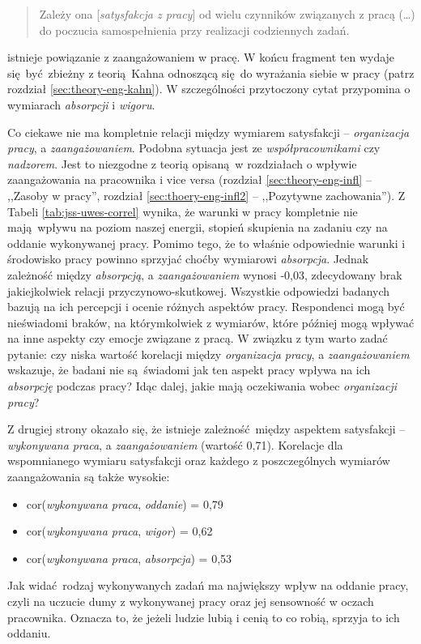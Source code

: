 \begin{quote}
  Zależy ona [\textit{satysfakcja z pracy}] od wielu czynników związanych z pracą (\ldots) do poczucia samospełnienia przy realizacji codziennych zadań.
\end{quote}

istnieje powiązanie z zaangażowaniem w pracę. W końcu fragment ten wydaje się być zbieżny z teorią Kahna odnoszącą się do wyrażania siebie w pracy (patrz rozdział \ref{sec:theory-eng-kahn}). W szczególności przytoczony cytat przypomina o wymiarach \textit{absorpcji} i \textit{wigoru}. 

Co ciekawe nie ma kompletnie relacji między wymiarem satysfakcji -- \textit{organizacja pracy}, a \textit{zaangażowaniem}. Podobna sytuacja jest ze \textit{współpracownikami} czy \textit{nadzorem}. Jest to niezgodne z teorią opisaną w rozdziałach o wpływie zaangażowania na pracownika i vice versa (rozdział \ref{sec:theory-eng-infl} -- ,,Zasoby w pracy'', rozdział \ref{sec:thoery-eng-infl2} -- ,,Pozytywne zachowania''). Z Tabeli \ref{tab:jss-uwes-correl} wynika, że warunki w pracy kompletnie nie mają wpływu na poziom naszej energii, stopień skupienia na zadaniu czy na oddanie
wykonywanej pracy. Pomimo tego, że to właśnie odpowiednie warunki i środowisko pracy powinno sprzyjać choćby wymiarowi \textit{absorpcja}. Jednak zależność między \textit{absorpcją}, a \textit{zaangażowaniem} wynosi
-0,03, zdecydowany brak jakiejkolwiek relacji przyczynowo-skutkowej. Wszystkie odpowiedzi badanych bazują na ich percepcji i ocenie różnych aspektów pracy. Respondenci mogą być nieświadomi braków, na którymkolwiek z wymiarów, które później mogą wpływać na inne aspekty czy emocje związane z pracą. W związku z tym warto zadać pytanie: czy niska wartość korelacji między \textit{organizacja pracy}, a \textit{zaangażowaniem} wskazuje, że badani nie są świadomi jak ten aspekt pracy wpływa na ich \textit{absorpcję} podczas pracy? Idąc dalej, jakie mają oczekiwania wobec
\textit{organizacji pracy}?

Z drugiej strony okazało się, że istnieje zależność między aspektem satysfakcji --\textit{wykonywana praca}, a \textit{zaangażowaniem} (wartość 0,71). Korelacje dla wspomnianego wymiaru satysfakcji oraz każdego z poszczególnych wymiarów zaangażowania są także wysokie:
\begin{itemize}
  \item cor(\textit{wykonywana praca}, \textit{oddanie}) = 0,79
  \item cor(\textit{wykonywana praca}, \textit{wigor}) = 0,62
  \item cor(\textit{wykonywana praca}, \textit{absorpcja}) = 0,53
\end{itemize}
Jak widać rodzaj wykonywanych zadań ma największy wpływ na oddanie pracy, czyli na uczucie dumy z wykonywanej pracy oraz jej sensowność w oczach pracownika. Oznacza to, że jeżeli ludzie lubią i cenią to co robią, sprzyja to ich oddaniu. 

